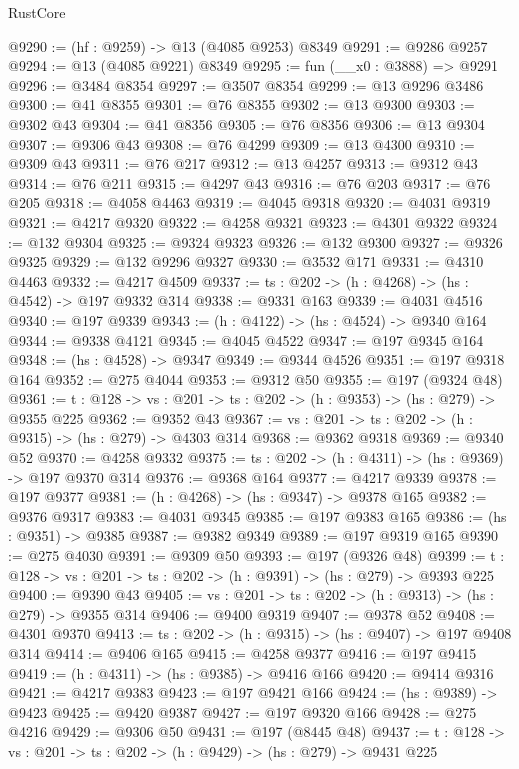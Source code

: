 \begin{lexlean}{RustCore}
\begin{coremodule}
@9290 := (hf : @9259) -> @13 (@4085 @9253) @8349
@9291 := @9286 @9257
@9294 := @13 (@4085 @9221) @8349
@9295 := fun (__x0 : @3888) => @9291
@9296 := @3484 @8354
@9297 := @3507 @8354
@9299 := @13 @9296 @3486
@9300 := @41 @8355
@9301 := @76 @8355
@9302 := @13 @9300
@9303 := @9302 @43
@9304 := @41 @8356
@9305 := @76 @8356
@9306 := @13 @9304
@9307 := @9306 @43
@9308 := @76 @4299
@9309 := @13 @4300
@9310 := @9309 @43
@9311 := @76 @217
@9312 := @13 @4257
@9313 := @9312 @43
@9314 := @76 @211
@9315 := @4297 @43
@9316 := @76 @203
@9317 := @76 @205
@9318 := @4058 @4463
@9319 := @4045 @9318
@9320 := @4031 @9319
@9321 := @4217 @9320
@9322 := @4258 @9321
@9323 := @4301 @9322
@9324 := @132 @9304
@9325 := @9324 @9323
@9326 := @132 @9300
@9327 := @9326 @9325
@9329 := @132 @9296 @9327
@9330 := @3532 @171
@9331 := @4310 @4463
@9332 := @4217 @4509
@9337 := {ts : @202} -> (h : @4268) -> (hs : @4542) -> @197 @9332 @314
@9338 := @9331 @163
@9339 := @4031 @4516
@9340 := @197 @9339
@9343 := (h : @4122) -> (hs : @4524) -> @9340 @164
@9344 := @9338 @4121
@9345 := @4045 @4522
@9347 := @197 @9345 @164
@9348 := (hs : @4528) -> @9347
@9349 := @9344 @4526
@9351 := @197 @9318 @164
@9352 := @275 @4044
@9353 := @9312 @50
@9355 := @197 (@9324 @48)
@9361 := {t : @128} -> {vs : @201} -> {ts : @202} -> (h : @9353) -> (hs : @279) -> @9355 @225
@9362 := @9352 @43
@9367 := {vs : @201} -> {ts : @202} -> (h : @9315) -> (hs : @279) -> @4303 @314
@9368 := @9362 @9318
@9369 := @9340 @52
@9370 := @4258 @9332
@9375 := {ts : @202} -> (h : @4311) -> (hs : @9369) -> @197 @9370 @314
@9376 := @9368 @164
@9377 := @4217 @9339
@9378 := @197 @9377
@9381 := (h : @4268) -> (hs : @9347) -> @9378 @165
@9382 := @9376 @9317
@9383 := @4031 @9345
@9385 := @197 @9383 @165
@9386 := (hs : @9351) -> @9385
@9387 := @9382 @9349
@9389 := @197 @9319 @165
@9390 := @275 @4030
@9391 := @9309 @50
@9393 := @197 (@9326 @48)
@9399 := {t : @128} -> {vs : @201} -> {ts : @202} -> (h : @9391) -> (hs : @279) -> @9393 @225
@9400 := @9390 @43
@9405 := {vs : @201} -> {ts : @202} -> (h : @9313) -> (hs : @279) -> @9355 @314
@9406 := @9400 @9319
@9407 := @9378 @52
@9408 := @4301 @9370
@9413 := {ts : @202} -> (h : @9315) -> (hs : @9407) -> @197 @9408 @314
@9414 := @9406 @165
@9415 := @4258 @9377
@9416 := @197 @9415
@9419 := (h : @4311) -> (hs : @9385) -> @9416 @166
@9420 := @9414 @9316
@9421 := @4217 @9383
@9423 := @197 @9421 @166
@9424 := (hs : @9389) -> @9423
@9425 := @9420 @9387
@9427 := @197 @9320 @166
@9428 := @275 @4216
@9429 := @9306 @50
@9431 := @197 (@8445 @48)
@9437 := {t : @128} -> {vs : @201} -> {ts : @202} -> (h : @9429) -> (hs : @279) -> @9431 @225

\end{coremodule}
\end{lexlean}
